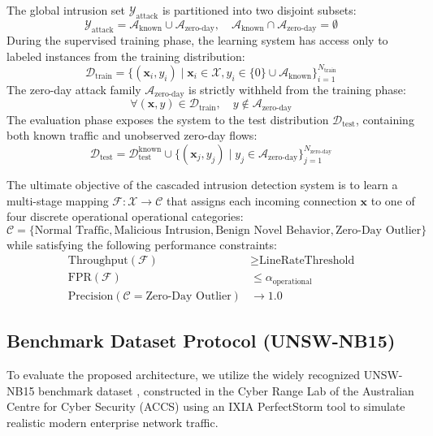 \documentclass[preprint,12pt]{elsarticle}
\begin{document}
The global intrusion set $\mathcal{Y}_{\text{attack}}$ is partitioned into two disjoint subsets:
\begin{equation}
    \mathcal{Y}_{\text{attack}} = \mathcal{A}_{\text{known}} \cup \mathcal{A}_{\text{zero-day}}, \quad \mathcal{A}_{\text{known}} \cap \mathcal{A}_{\text{zero-day}} = \emptyset
\end{equation}
During the supervised training phase, the learning system has access only to labeled instances from the training distribution:
\begin{equation}
    \mathcal{D}_{\text{train}} = \{(\mathbf{x}_i, y_i) \mid \mathbf{x}_i \in \mathcal{X}, y_i \in \{0\} \cup \mathcal{A}_{\text{known}}\}_{i=1}^{N_{\text{train}}}
\end{equation}
The zero-day attack family $\mathcal{A}_{\text{zero-day}}$ is strictly withheld from the training phase:
\begin{equation}
    \forall (\mathbf{x}, y) \in \mathcal{D}_{\text{train}}, \quad y \notin \mathcal{A}_{\text{zero-day}}
\end{equation}
The evaluation phase exposes the system to the test distribution $\mathcal{D}_{\text{test}}$, containing both known traffic and unobserved zero-day flows:
\begin{equation}
    \mathcal{D}_{\text{test}} = \mathcal{D}_{\text{test}}^{\text{known}} \cup \{(\mathbf{x}_j, y_j) \mid y_j \in \mathcal{A}_{\text{zero-day}}\}_{j=1}^{N_{\text{zero-day}}}
\end{equation}

The ultimate objective of the cascaded intrusion detection system is to learn a multi-stage mapping $\mathcal{F}: \mathcal{X} \to \mathcal{C}$ that assigns each incoming connection $\mathbf{x}$ to one of four discrete operational operational categories:
\begin{equation}
    \mathcal{C} = \{\text{Normal Traffic}, \text{Malicious Intrusion}, \text{Benign Novel Behavior}, \text{Zero-Day Outlier}\}
\end{equation}
while satisfying the following performance constraints:
\begin{align}
    \text{Throughput}(\mathcal{F}) &\ge \text{LineRateThreshold} \\
    \text{FPR}(\mathcal{F}) &\le \alpha_{\text{operational}} \\
    \text{Precision}(\mathcal{C} = \text{Zero-Day Outlier}) &\to 1.0
\end{align}

\subsection{Benchmark Dataset Protocol (UNSW-NB15)}
To evaluate the proposed architecture, we utilize the widely recognized UNSW-NB15 benchmark dataset \cite{moustafa2015unsw}, constructed in the Cyber Range Lab of the Australian Centre for Cyber Security (ACCS) using an IXIA PerfectStorm tool to simulate realistic modern enterprise network traffic. 
\end{document}
